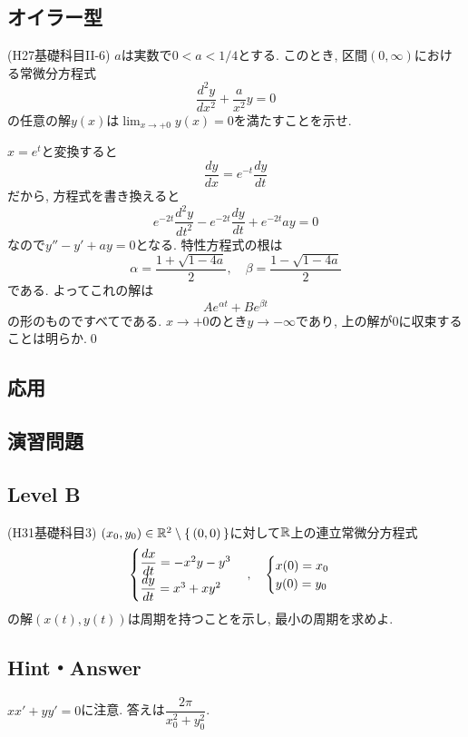 \subsection{オイラー型}
\begin{egprob} (H27基礎科目II-6)
$a$は実数で$0<a<1/4$とする. このとき, 区間$(0,\infty)$における常微分方程式
\[\dfrac{d^2 y}{dx^2} + \dfrac{a}{x^2} y = 0\]
の任意の解$y(x)$は$\lim_{x\to +0} y(x) = 0$を満たすことを示せ.
\end{egprob}

\begin{egans}
$x=e^t$と変換すると
\[\dfrac{dy}{dx} = e^{-t}\dfrac{dy}{dt}\]
だから, 方程式を書き換えると
\[e^{-2t} \dfrac{d^2y}{dt^2} - e^{-2t} \dfrac{dy}{dt} + e^{-2t} ay = 0\]
なので$y''- y' + ay = 0$となる. 特性方程式の根は
\[\alpha = \dfrac{1 + \sqrt{1-4a}}{2},\quad \beta = \dfrac{1-\sqrt{1-4a}}{2}\]
である. よってこれの解は
\[ Ae^{\alpha t} + Be^{\beta t} \]
の形のものですべてである. $x\to +0$のとき$y\to -\infty$であり, 上の解が0に収束することは明らか.\qed

\end{egans}



\subsection{応用}

\subsection{演習問題}

\subsection{Level B}
\begin{prob} (H31基礎科目3)  \label{prob:H31kiso3}
$(x_0,y_0)\in \mathbb{R}^2\setminus{\set{(0,0)}}$に対して$\mathbb{R}$上の連立常微分方程式
\[
\begin{cases}
\dfrac{dx}{dt} = -x^2y - y^3 \\
\dfrac{dy}{dt} = x^3 + xy^2
\end{cases}
,\quad \begin{cases}
x(0) = x_0 \\
y(0) = y_0
\end{cases}
\]
の解$(x(t),y(t))$は周期を持つことを示し, 最小の周期を求めよ.
\end{prob}

\newpage
\subsection{Hint・Answer}
\begin{probans}
$xx' + yy' = 0$に注意.  答えは$\dfrac{2\pi}{x_0^2 + y_0^2}$.
\end{probans}
